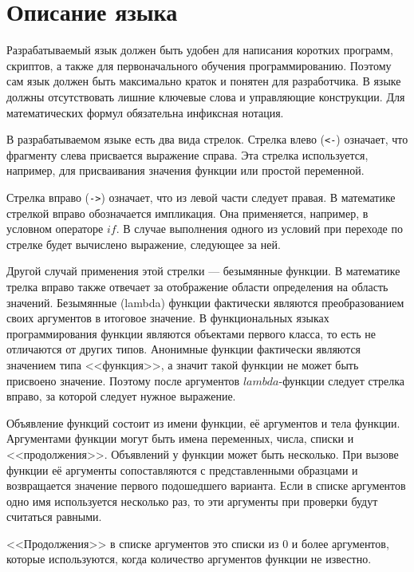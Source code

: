 \section{Описание языка}
    Разрабатываемый язык должен быть удобен для написания коротких программ, скриптов, а также для первоначального обучения программированию.
    Поэтому сам язык должен быть максимально краток и понятен для разработчика.
    В языке должны отсутствовать лишние ключевые слова и управляющие конструкции.
    Для математических формул обязательна инфиксная нотация.

    В разрабатываемом языке есть два вида стрелок.
    Стрелка влево (\verb!<-!) означает, что фрагменту слева присвается выражение справа.
    Эта стрелка используется, например, для присваивания значения функции или простой переменной.

    Стрелка вправо (\verb!->!) означает, что из левой части следует правая.
    В математике стрелкой вправо обозначается импликация.
    Она применяется, например, в условном операторе $if$.
    В случае выполнения одного из условий при переходе по стрелке будет вычислено выражение, следующее за ней.
    
    Другой случай применения этой стрелки --- безымянные функции.
    В математике трелка вправо также отвечает за отображение области определения на область значений.
    Безымянные (lambda) функции фактически являются преобразованием своих аргументов в итоговое значение.
    В функциональных языках программирования функции являются объектами первого класса, то есть не отличаются от других типов.
    Анонимные функции фактически являются значением типа <<функция>>, а значит такой функции не может быть присвоено значение.
    Поэтому после аргументов $lambda$-функции следует стрелка вправо, за которой следует нужное выражение.

    Объявление функций состоит из имени функции, её аргументов и тела функции.
    Аргументами функции могут быть имена переменных, числа, списки и <<продолжения>>.
    Объявлений у функции может быть несколько.
    При вызове функции её аргументы сопоставляются с представленными образцами и возвращается значение первого подошедшего варианта.
    Если в списке аргументов одно имя используется несколько раз, то эти аргументы при проверки будут считаться равными.

    <<Продолжения>> в списке аргументов это списки из 0 и более аргументов, которые используются, когда количество аргументов функции не известно.

